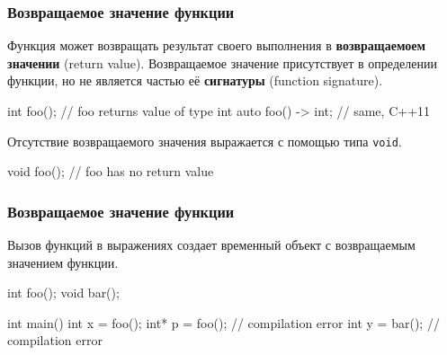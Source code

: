 \documentclass[compress, 8pt, aspectratio=169]{beamer}
\begin{document}
\begin{frame}[fragile]

    \frametitle{Возвращаемое значение функции}

    Функция может возвращать результат своего выполнения в \textbf{возвращаемоем значении}
    (return value).
    Возвращаемое значение присутствует в определении функции, но не является частью её \textbf{сигнатуры}
    (function signature\footnotemark{}).


    \begin{myinplacelisting}[minted language=cpp]
int foo(); // foo returns value of type int
auto foo() -> int; // same, C++11
    \end{myinplacelisting}

    Отсутствие возвращаемого значения выражается с помощью типа \verb|void|.

    \begin{myinplacelisting}[minted language=cpp]
void foo(); // foo has no return value
    \end{myinplacelisting}

\end{frame}

\begin{frame}[fragile]

    \frametitle{Возвращаемое значение функции}

    Вызов функций в выражениях создает временный объект с возвращаемым
    значением функции.

    \begin{myinplacelisting}[minted language=cpp]
int foo();
void bar();

int main() {
    int x = foo();
    int* p = foo(); // compilation error
    int y = bar(); // compilation error
}
    \end{myinplacelisting}

\end{frame}
\end{document}
